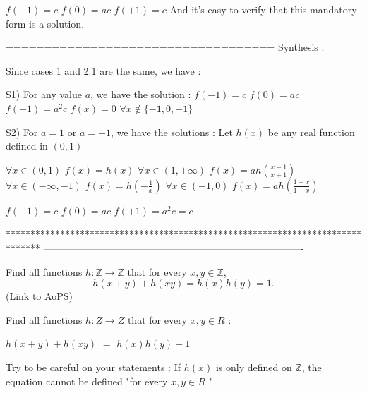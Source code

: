 \begin{solution}
$ f( - 1) = c$
$ f(0) = ac$
$ f( + 1) = c$
And it's easy to verify that this mandatory form is a solution.

===================================
Synthesis :

Since cases 1 and 2.1 are the same, we have :

S1) For any value $ a$, we have the solution :
$ f( - 1) = c$
$ f(0) = ac$
$ f( + 1) = a^2c$
$ f(x) = 0$ $ \forall x\notin\{ - 1,0, + 1\}$

S2) For $ a = 1$ or $ a = - 1$, we have the solutions :
Let $ h(x)$ be any real function defined in $ (0,1)$

$ \forall x\in(0,1)$ $ f(x) = h(x)$
$ \forall x\in(1, + \infty)$ $ f(x) = ah(\frac {x - 1}{x + 1})$
$ \forall x\in( - \infty, - 1)$ $ f(x) = h( - \frac {1}{x})$
$ \forall x\in( - 1,0)$ $ f(x) = ah(\frac {1 + x}{1 - x})$

$ f( - 1) = c$
$ f(0) = ac$
$ f( + 1) = a^2c = c$
\end{solution}
*******************************************************************************
-------------------------------------------------------------------------------

\begin{problem}
	Find all functions $ h : \mathbb Z \longrightarrow \mathbb Z$ that for every $ x,y \in \mathbb Z$,
\[h(x+y) + h(xy)= h(x)h(y) = 1.\]
	\flushright \href{https://artofproblemsolving.com/community/c6h272555}{(Link to AoPS)}
\end{problem}



\begin{solution}
	\begin{tcolorbox}Find all functions $ h : Z \longrightarrow Z$ that for every $ x,y \in R$ :

$ h(x + y) + h(xy)$ $ =$ $ h(x)h(y) + 1$\end{tcolorbox}

Try to be careful on your statements : If $ h(x)$ is only defined on $ \mathbb{Z}$, the equation cannot be defined "for every $ x,y \in R$ "
\end{solution}



